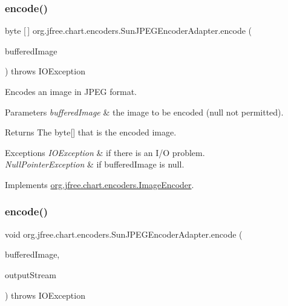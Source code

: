 \subsubsection{\texorpdfstring{encode()}{encode()}\hspace{0.1cm}{\footnotesize\ttfamily [1/2]}}
{\footnotesize\ttfamily byte \mbox{[}$\,$\mbox{]} org.\+jfree.\+chart.\+encoders.\+Sun\+J\+P\+E\+G\+Encoder\+Adapter.\+encode (\begin{DoxyParamCaption}\item[{Buffered\+Image}]{buffered\+Image }\end{DoxyParamCaption}) throws I\+O\+Exception}

Encodes an image in J\+P\+EG format.


\begin{DoxyParams}{Parameters}
{\em buffered\+Image} & the image to be encoded ({\ttfamily null} not permitted).\\
\hline
\end{DoxyParams}
\begin{DoxyReturn}{Returns}
The byte\mbox{[}\mbox{]} that is the encoded image.
\end{DoxyReturn}

\begin{DoxyExceptions}{Exceptions}
{\em I\+O\+Exception} & if there is an I/O problem. \\
\hline
{\em Null\+Pointer\+Exception} & if {\ttfamily buffered\+Image} is {\ttfamily null}. \\
\hline
\end{DoxyExceptions}


Implements \mbox{\hyperlink{interfaceorg_1_1jfree_1_1chart_1_1encoders_1_1_image_encoder_a3290449de5246d80ca626835e5dac183}{org.\+jfree.\+chart.\+encoders.\+Image\+Encoder}}.

\mbox{\label{classorg_1_1jfree_1_1chart_1_1encoders_1_1_sun_j_p_e_g_encoder_adapter_a04af4aa9592b9b63934742a6fce74fcd}} 
\subsubsection{\texorpdfstring{encode()}{encode()}\hspace{0.1cm}{\footnotesize\ttfamily [2/2]}}
{\footnotesize\ttfamily void org.\+jfree.\+chart.\+encoders.\+Sun\+J\+P\+E\+G\+Encoder\+Adapter.\+encode (\begin{DoxyParamCaption}\item[{Buffered\+Image}]{buffered\+Image,  }\item[{Output\+Stream}]{output\+Stream }\end{DoxyParamCaption}) throws I\+O\+Exception}

